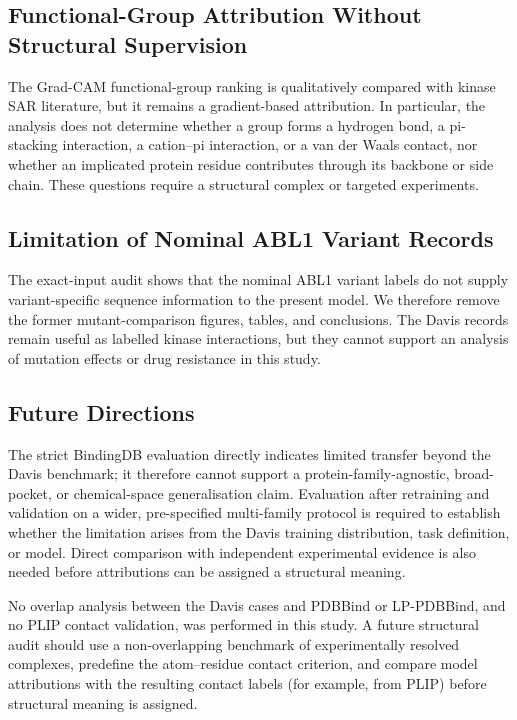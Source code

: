 \documentclass[fleqn,10pt]{wlscirep}
\begin{document}
\subsection{Functional-Group Attribution Without Structural Supervision}

The Grad-CAM functional-group ranking is qualitatively compared with kinase
SAR literature, but it remains a gradient-based attribution.  In particular,
the analysis does not determine whether a group forms a hydrogen bond, a
pi-stacking interaction, a cation--pi interaction, or a van der Waals contact,
nor whether an implicated protein residue contributes through its backbone or
side chain.  These questions require a structural complex or targeted
experiments.\cite{zhang2009targeting}

\subsection{Limitation of Nominal ABL1 Variant Records}

The exact-input audit shows that the nominal ABL1 variant labels do not supply
variant-specific sequence information to the present model. We therefore remove
the former mutant-comparison figures, tables, and conclusions. The Davis records
remain useful as labelled kinase interactions, but they cannot support an
analysis of mutation effects or drug resistance in this study.

\subsection{Future Directions}

The strict BindingDB evaluation directly indicates limited transfer beyond the
Davis benchmark; it therefore cannot support a protein-family-agnostic,
broad-pocket, or chemical-space generalisation claim.  Evaluation after
retraining and validation on a wider, pre-specified multi-family protocol is
required to establish whether the limitation arises from the Davis training
distribution, task definition, or model. Direct comparison with independent
experimental evidence is also needed before attributions can be assigned a
structural meaning.

No overlap analysis between the Davis cases and PDBBind or LP-PDBBind, and no
PLIP contact validation, was performed in this study. A future structural audit
should use a non-overlapping benchmark of experimentally resolved complexes,
predefine the atom--residue contact criterion, and compare model attributions
with the resulting contact labels (for example, from PLIP) before structural
meaning is assigned.\cite{salentin2015plip}
\end{document}
